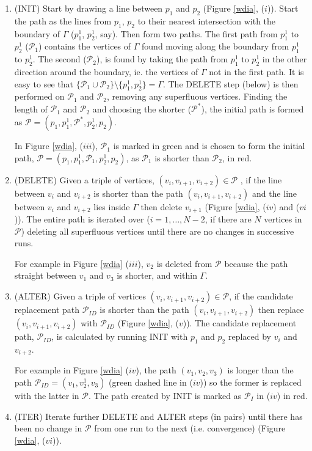 \documentclass[useAMS, referee]{biom}
\begin{document}
\begin{enumerate}
\item (INIT) Start by drawing a line between $p_1$ and $p_2$ (Figure \ref{wdia}, ($i$)). Start the path as the lines from $p_1$, $p_2$ to their nearest intersection with the boundary of $\Gamma$ ($p_1^1$, $p_2^1$, say). Then form two paths. The first path from $p_1^1$ to $p_2^1$ ($\mathcal{P}_1$) contains the vertices of $\Gamma$ found moving along the boundary from $p_1^1$ to $p_2^1$. The second ($\mathcal{P}_2$), is found by taking the path from $p_1^1$ to $p_2^1$ in the other direction around the boundary, ie. the vertices of $\Gamma$ not in the first path. It is easy to see that $\{\mathcal{P}_1 \cup \mathcal{P}_2\} \setminus \{p_1^1, p_2^1\} = \Gamma$. The DELETE step (below) is then performed on $\mathcal{P}_1$ and $\mathcal{P}_2$, removing any superfluous vertices. Finding the length of $\mathcal{P}_1$ and $\mathcal{P}_2$ and choosing the shorter ($\mathcal{P^*}$), the initial path is formed as $\mathcal{P}=(p_1,p_1^1,\mathcal{P}^*,p_2^1,p_2)$. 

In Figure \ref{wdia}, ($iii$), $\mathcal{P}_1$ is marked in green and is chosen to form the initial path, $\mathcal{P}=(p_1,p_1^1,\mathcal{P}_1,p_2^1,p_2)$, as $\mathcal{P}_1$ is shorter than $\mathcal{P}_2$, in red.

\item (DELETE) Given a triple of vertices, $(v_i, v_{i+1}, v_{i+2}) \in \mathcal{P}$ , if the line between $v_i$ and $v_{i+2}$ is shorter than the path $(v_i, v_{i+1}, v_{i+2})$ and the line between $v_i$ and $v_{i+2}$ lies inside $\Gamma$ then delete $v_{i+1}$ (Figure \ref{wdia}, ($iv$) and ($vi$)). The entire path is iterated over ($i=1,\ldots,N-2$, if there are $N$ vertices in $\mathcal{P}$)  deleting all superfluous vertices until there are no changes in successive runs. 

For example in Figure \ref{wdia} ($iii$), $v_2$ is deleted from $\mathcal{P}$ because the path straight between $v_1$ and $v_3$ is shorter, and within $\Gamma$.

\item (ALTER) Given a triple of vertices $(v_i, v_{i+1}, v_{i+2}) \in \mathcal{P}$, if the candidate replacement path $\mathcal{P}_{ID}$ is shorter than the path $(v_i, v_{i+1}, v_{i+2})$ then replace $(v_i, v_{i+1}, v_{i+2})$ with $\mathcal{P}_{ID}$ (Figure \ref{wdia}, ($v$)). The candidate replacement path, $\mathcal{P}_{ID}$, is calculated by running INIT with $p_1$ and $p_2$ replaced by $v_i$ and $v_{i+2}$.

For example in Figure \ref{wdia} ($iv$), the path $(v_1, v_2, v_3)$ is longer than the path $\mathcal{P}_{ID}=(v_1, v^1_2, v_3)$ (green dashed line in ($iv$)) so the former is replaced with the latter in $\mathcal{P}$. The path created by INIT is marked as $\mathcal{P}_{I}$ in  ($iv$) in red.

\item (ITER) Iterate further DELETE and ALTER steps (in pairs) until there has been no change in $\mathcal{P}$ from one run to the next (i.e. convergence) (Figure \ref{wdia}, ($vi$)).
\end{enumerate}
\end{document}
